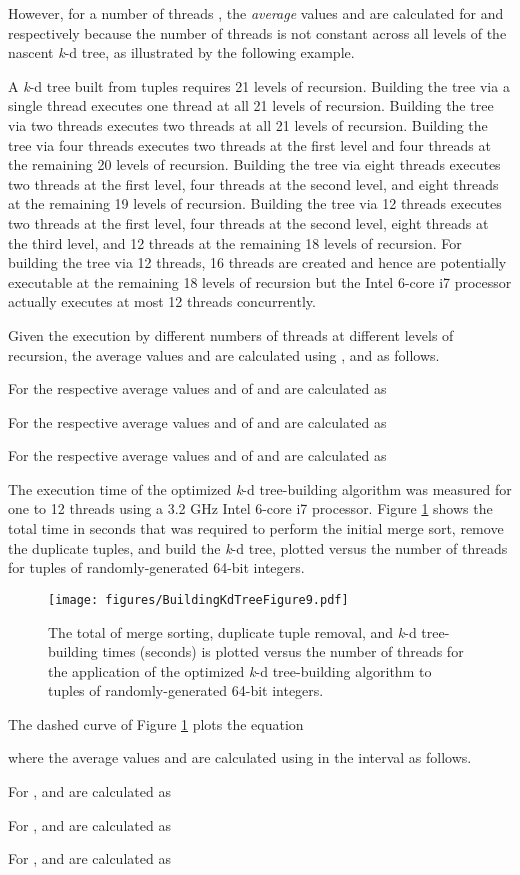 \documentclass{sig-alternate}
\begin{document}
However, for a number of threads , the \emph{average} values  and  are calculated for  and  respectively because the number of threads  is not constant across all levels of the nascent \emph{k}-d tree, as illustrated by the following example.

A \emph{k}-d tree built from  tuples requires 21 levels of recursion. Building the tree via a single thread executes one thread at all 21 levels of recursion.  Building the tree via two threads executes two threads at all 21 levels of recursion. Building the tree via four threads executes two threads at the first level and four threads at the remaining 20 levels of recursion. Building the tree via eight threads executes two threads at the first level, four threads at the second level, and eight threads at the remaining 19 levels of recursion. Building the tree via 12 threads executes two threads at the first level, four threads at the second level, eight threads at the third level, and 12 threads at the remaining 18 levels of recursion. For building the tree via 12 threads, 16 threads are created and hence are potentially executable at the remaining 18 levels of recursion but the Intel 6-core i7 processor actually executes at most 12 threads concurrently.

Given the execution by different numbers of threads at different levels of recursion, the average values  and  are calculated using ,  and  as follows.

For  the respective average values  and  of  and  are calculated as


For  the respective average values  and  of  and  are calculated as


For  the respective average values  and  of  and  are calculated as


The execution time of the optimized  \emph{k}-d tree-building algorithm was measured for one to 12 threads using a 3.2 GHz Intel 6-core i7 processor.  Figure \ref{fig:Optimized} shows the total time in seconds that was required to perform the initial merge sort, remove the duplicate tuples, and build the \emph{k}-d tree, plotted versus the number of threads  for   tuples of randomly-generated 64-bit integers.

\begin{figure}[h]
\centering
\centerline{\texttt{[image: figures/BuildingKdTreeFigure9.pdf]}}
\caption{The total of merge sorting, duplicate tuple removal, and \emph{k}-d tree-building times (seconds) is plotted versus the number of threads for the application of the optimized  \emph{k}-d tree-building algorithm to    tuples of randomly-generated 64-bit integers.}
\label{fig:Optimized}
\end{figure}

\newpage

The dashed curve of Figure \ref{fig:Optimized} plots the equation

where the average values  and  are calculated using  in the interval  as follows.

For ,  and  are calculated as


For ,  and  are calculated as


For ,  and  are calculated as



  
\end{document}
